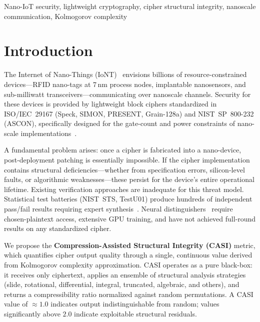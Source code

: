 \documentclass[conference]{IEEEtran}
\begin{document}
\begin{IEEEkeywords}
Nano-IoT security, lightweight cryptography, cipher structural integrity, nanoscale communication, Kolmogorov complexity
\end{IEEEkeywords}

\section{Introduction}
\label{sec:intro}

The Internet of Nano-Things (IoNT)~\cite{akyildiz2010} envisions billions of resource-constrained devices---RFID nano-tags at 7\,nm process nodes, implantable nanosensors, and sub-milliwatt transceivers---communicating over nanoscale channels.
Security for these devices is provided by lightweight block ciphers standardized in ISO/IEC~29167 (Speck, SIMON, PRESENT, Grain-128a) and NIST~SP~800-232 (ASCON), specifically designed for the gate-count and power constraints of nano-scale implementations~\cite{nistlwc2023}.

A fundamental problem arises: once a cipher is fabricated into a nano-device, post-deployment patching is essentially impossible.
If the cipher implementation contains structural deficiencies---whether from specification errors, silicon-level faults, or algorithmic weaknesses---these persist for the device's entire operational lifetime.
Existing verification approaches are inadequate for this threat model.
Statistical test batteries (NIST~STS, TestU01) produce hundreds of independent pass/fail results requiring expert synthesis~\cite{kubicek2020}.
Neural distinguishers~\cite{gohr2019} require chosen-plaintext access, extensive GPU training, and have not achieved full-round results on any standardized cipher.

We propose the \textbf{Compression-Assisted Structural Integrity (CASI)} metric, which quantifies cipher output quality through a single, continuous value derived from Kolmogorov complexity approximation.
CASI operates as a pure black-box: it receives only ciphertext, applies an ensemble of structural analysis strategies (slide, rotational, differential, integral, truncated, algebraic, and others), and returns a compressibility ratio normalized against random permutations.
A CASI value of $\approx 1.0$ indicates output indistinguishable from random; values significantly above $2.0$ indicate exploitable structural residuals.
\end{document}

